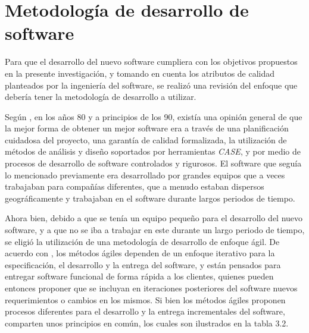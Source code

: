 	\section{Metodolog\'{i}a de desarrollo de software}
Para que el desarrollo del nuevo software cumpliera con los objetivos propuestos en la presente investigaci\'{o}n, y tomando en cuenta los atributos de calidad planteados por la ingenier\'{i}a del software, se realiz\'{o} una revisi\'{o}n del enfoque que deber\'{i}a tener la metodolog\'{i}a de desarrollo a utilizar.

Seg\'{u}n \cite{Sommerville}, en los a\~{n}os 80 y a principios de los 90, exist\'{i}a una opini\'{o}n general de que la mejor forma de obtener un mejor software era a trav\'{e}s de una planificaci\'{o}n cuidadosa del proyecto, una garant\'{i}a de calidad formalizada, la utilizaci\'{o}n de m\'{e}todos de an\'{a}lisis y dise\~{n}o soportados por herramientas \textit{CASE}, y por medio de procesos de desarrollo de software controlados y rigurosos. El software que segu\'{i}a lo mencionado previamente era desarrollado por grandes equipos que a veces trabajaban para compa\~{n}\'{i}as diferentes, que a menudo estaban dispersos geogr\'{a}ficamente y trabajaban en el software durante largos periodos de tiempo.

Ahora bien, debido a que se ten\'{i}a un equipo peque\~{n}o para el desarrollo del nuevo software, y a que no se iba a trabajar en este durante un largo periodo de tiempo, se eligi\'{o} la utilizaci\'{o}n de una metodolog\'{i}a de desarrollo de enfoque \'{a}gil. De acuerdo con \cite{Sommerville}, los m\'{e}todos \'{a}giles dependen de un enfoque iterativo para la especificaci\'{o}n, el desarrollo y la entrega del software, y est\'{a}n pensados para entregar software funcional de forma r\'{a}pida a los clientes, quienes pueden entonces proponer que se incluyan en iteraciones posteriores del software nuevos requerimientos o cambios en los mismos. Si bien los m\'{e}todos \'{a}giles proponen procesos diferentes para el desarrollo y la entrega incrementales del software, comparten unos principios en com\'{u}n, los cuales son ilustrados en la tabla 3.2.

